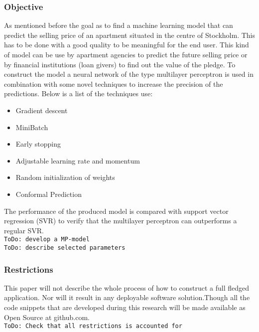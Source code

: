 \subsubsection{Objective}
As mentioned before the goal as to find a machine learning model that can predict the selling price of an apartment situated in the centre of Stockholm. This has to be done with a good quality to be meaningful for the end user. This kind of model can be use by apartment agencies to predict the future selling price or by financial institutions (loan givers) to find out the value of the pledge. To construct the model a neural network of the type multilayer perceptron is used in combination with some novel techniques to increase the precision of the predictions. Below is a list of the techniques use:
\begin{itemize}
\item Gradient descent
\item MiniBatch
\item Early stopping
\item Adjustable learning rate and momentum
\item Random initialization of weights
\item Conformal Prediction
\end{itemize}
The performance of the produced model is compared with support vector regression (SVR) to verify that the multilayer perceptron can outperforms a regular SVR. 
\\
\texttt{ToDo: develop a MP-model} \\
\texttt{ToDo: describe selected parameters} \\

\subsubsection{Restrictions}
This paper will not describe the whole process of how to construct a full fledged application. Nor will it result in any deployable software solution.Though all the code snippets that are developed during this research will be made available as Open Source at github.com.
\\
\texttt{ToDo: Check that all restrictions is accounted for}\\



